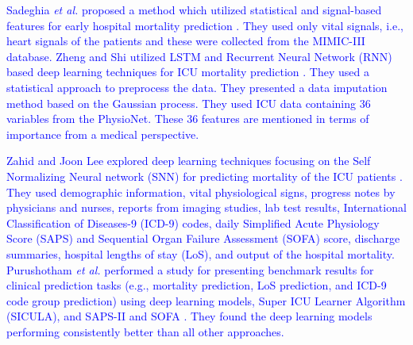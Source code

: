 \textcolor{blue}{Sadeghia \textit{et al.} proposed a method which utilized statistical and signal-based features for early hospital mortality prediction \cite{Sadeghi2018}. They used only vital signals, i.e., heart signals of the patients and these were collected from the MIMIC-III database. Zheng and Shi utilized LSTM and Recurrent Neural Network (RNN) based deep learning techniques for ICU mortality prediction \cite{Zheng2018}. They used a statistical approach to preprocess the data. They presented a data imputation method based on the Gaussian process. They used ICU data containing 36 variables from the PhysioNet. These 36 features are mentioned in terms of importance from a medical perspective.} 

\textcolor{blue}{Zahid and Joon Lee explored deep learning techniques focusing on the Self Normalizing Neural network (SNN) for predicting mortality of the ICU patients \cite{Zahid2018}. They used demographic information, vital physiological signs, progress notes by physicians and nurses, reports from imaging studies, lab test results, International Classification of Diseases-9 (ICD-9) codes, daily Simplified Acute Physiology Score (SAPS) and Sequential Organ Failure Assessment (SOFA) score, discharge summaries, hospital lengths of stay (LoS), and output of the hospital mortality. Purushotham \textit{et al.} performed a study for presenting benchmark results for clinical prediction tasks (e.g., mortality prediction, LoS prediction, and ICD-9 code group prediction) using deep learning models, Super ICU Learner Algorithm (SICULA), and SAPS-II and SOFA \cite{Purushotham2018}. They found the deep learning models performing consistently better than all other approaches.} 

